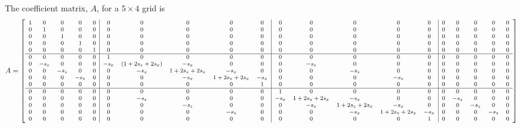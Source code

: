     \begin{landscape}%
 	The coefficient matrix, $A$, for a $5 \times 4$ grid is
        \centering %
\begin{equation}
\setcounter{MaxMatrixCols}{20}
\footnotesize{
A = \begin{bmatrix}
    \begin{array}{ccccc|ccccc|ccccc|ccccc}
       1 & 0 & 0 & 0 & 0 & 0 & 0 & 0 & 0 & 0 & 0 & 0 & 0 & 0 & 0 & 0 & 0 & 0 & 0 & 0 \\ %
       0 & 1 & 0 & 0 & 0 & 0 & 0 & 0 & 0 & 0 & 0 & 0 & 0 & 0 & 0 & 0 & 0 & 0 & 0 & 0 \\ %
       0 & 0 & 1 & 0 & 0 & 0 & 0 & 0 & 0 & 0 & 0 & 0 & 0 & 0 & 0 & 0 & 0 & 0 & 0 & 0 \\ %
       0 & 0 & 0 & 1 & 0 & 0 & 0 & 0 & 0 & 0 & 0 & 0 & 0 & 0 & 0 & 0 & 0 & 0 & 0 & 0 \\ %
       0 & 0 & 0 & 0 & 1 & 0 & 0 & 0 & 0 & 0 & 0 & 0 & 0 & 0 & 0 & 0 & 0 & 0 & 0 & 0 \\ %
         \hline
       0 & 0 & 0 & 0 & 0 & 1 & 0 & 0 & 0 & 0 & 0 & 0 & 0 & 0 & 0 & 0 & 0 & 0 & 0 & 0 \\ %
       0 & -s_z & 0 & 0 & 0 & -s_x & (1+2s_z+2s_x) & -s_x & 0 & 0 & 0 & -s_z & 0 & 0 & 0 & 0 & 0 & 0 & 0 & 0 \\ %
       0 & 0 & -s_z & 0 & 0 & 0 & -s_x & 1+2s_z+2s_x & -s_x & 0 & 0 & 0 & -s_z & 0 & 0 & 0 & 0 & 0 & 0 & 0 \\ %
       0 & 0 & 0 & -s_z & 0 & 0 & 0 & -s_x & 1+2s_z+2s_x & -s_x & 0 & 0 & 0 & -s_z & 0 & 0 & 0 & 0 & 0 & 0 \\ %
       0 & 0 & 0 & 0 & 0 & 0 & 0 & 0 & 0 & 1 & 0 & 0 & 0 & 0 & 0 & 0 & 0 & 0 & 0 & 0 \\ %
          \hline
       0 & 0 & 0 & 0 & 0 & 0 & 0 & 0 & 0 & 0 & 1 & 0 & 0 & 0 & 0 & 0 & 0 & 0 & 0 & 0 \\ %
       0 & 0 & 0 & 0 & 0 & 0 & -s_z & 0 & 0 & 0 & -s_x & 1+2s_z+2s_x & -s_x & 0 & 0 & 0 & -s_z & 0 & 0 & 0 \\ %
       0 & 0 & 0 & 0 & 0 & 0 & 0 & -s_z & 0 & 0 & 0 & -s_x & 1+2s_z+2s_x & -s_x & 0 & 0 & 0 & -s_z & 0 & 0 \\ %
       0 & 0 & 0 & 0 & 0 & 0 & 0 & 0 & -s_z & 0 & 0 & 0 & -s_x & 1+2s_z+2s_x & -s_x & 0 & 0 & 0 & -s_z & 0 \\ %
       0 & 0 & 0 & 0 & 0 & 0 & 0 & 0 & 0 & 0 & 0 & 0 & 0 & 0 & 1 & 0 & 0 & 0 & 0 & 0 \\ %

\end{array}
\end{bmatrix}}
\end{equation}
\end{landscape}
